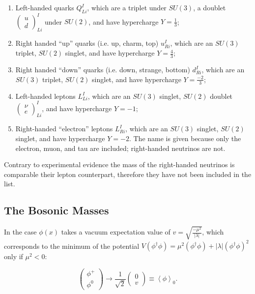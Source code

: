 \begin{enumerate}
	\label{enum:hypercharges}
	\item Left-handed quarks $Q^I_{Li}$, which are a triplet under $SU(3)$, a doublet $\left(\begin{array}{c} u \\ d \end{array} \right)^I_{Li}$ under $SU(2)$, and have hypercharge $Y = \frac{1}{3}$;
	\item Right handed ``up'' quarks (i.e. up, charm, top)  $u^I_{Ri}$, which are an $SU(3)$ triplet, $SU(2)$ singlet, and have hypercharge $Y = \frac{4}{3}$;
	\item Right handed ``down'' quarks (i.e. down, strange, bottom)  $d^I_{Ri}$, which are an $SU(3)$ triplet, $SU(2)$ singlet, and have hypercharge $Y = \frac{-2}{3}$;
	\item Left-handed leptons  $L^I_{Li}$, which are an $SU(3)$ singlet, $SU(2)$ doublet  $\left(\begin{array}{c} \nu \\ e \end{array} \right)^I_{Li}$, and have hypercharge $Y = -1$;
	\item Right-handed ``electron'' leptons $L^I_{Ri}$, which are an $SU(3)$ singlet, $SU(2)$ singlet, and have hypercharge $Y = -2$. The name is given because only the electron, muon, and tau are included; right-handed neutrinos are not.
\end{enumerate}

Contrary to experimental evidence the mass of the right-handed neutrinos is comparable their lepton counterpart, therefore they have not been included in the list.

\subsection{The Bosonic Masses}
\label{section:bosonicmasses}
In the case $\phi(x)$  takes a vacuum expectation value of $v =  \sqrt{\frac{-\mu^2}{|\lambda|}}$, which corresponds to the minimum of the potential $V(\phi^\dag\phi) = \mu^2(\phi^\dag\phi) + |\lambda|(\phi^\dag\phi)^2$ only if $\mu^2<0$:

\begin{equation}
\left( \begin{array}{c}
\phi^+ \\
\phi^0 \end{array} \right) \rightarrow \frac{1}{\sqrt{2}}\left( \begin{array}{c}
0 \\
v \end{array} \right) \equiv \left<\phi\right>_0.
\label{eqn:vevphi}
\end{equation}

